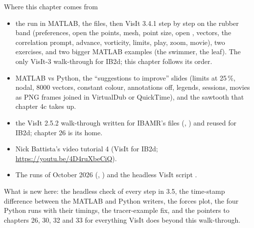 \documentclass[aspectratio=169,11pt]{beamer}
\begin{document}
\begin{frame}{Where this chapter comes from}
\label{fr:sources}
\footnotesize
\begin{itemize}
  \item {} the run in MATLAB, the files, then VisIt 3.4.1 step by step on the rubber band (preferences, open the points, mesh, point size, open , vectors, the correlation prompt, advance, vorticity, limits, play, zoom, movie), two exercises, and two bigger MATLAB examples (the swimmer, the leaf). The only VisIt-3 walk-through for IB2d; this chapter follows its order.
  \item {} MATLAB vs Python, the ``suggestions to improve'' slides (limits at 25\,\%, nodal, 8000 vectors, constant colour, annotations off, legends, sessions, movies as PNG frames joined in VirtualDub or QuickTime), and the sawtooth that chapter 4c takes up.
  \item {} the VisIt 2.5.2 walk-through written for IBAMR's files (, ) and reused for IB2d; chapter 26 is its home.
  \item Nick Battista's video tutorial 4 (VisIt for IB2d; \url{https://youtu.be/4D4ruXbeCiQ}).
  \item The runs of October 2026 (, ) and the headless VisIt script .
\end{itemize}
What is new here: the headless check of every step in 3.5, the time-stamp difference between the MATLAB and Python writers, the forces plot, the four Python runs with their timings, the tracer-example fix, and the pointers to chapters 26, 30, 32 and 33 for everything VisIt does beyond this walk-through.
\end{frame}
\end{document}

